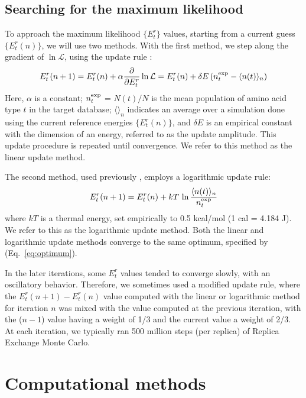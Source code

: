 \documentclass[12pt]{article}
\begin{document}
\subsection{Searching for the maximum likelihood}
To approach the maximum likelihood $\{E^r_t\}$ values, starting from a current guess $\{E^r_t(n)\}$, we will
use two methods. With the first method, we  step along the gradient of $\ln {\mathcal L}$, using the update
rule \cite{Kleinman06}:
\begin{equation} \label{eq:linear}
E^r_t (n+1) = E^r_t (n) + \alpha \frac{\partial}{\partial E^r_t} \ln {\mathcal L}
= E^r_t (n) + \delta E \, ( n_t^{\rm exp} - \langle n(t) \rangle_n)
\end{equation}
Here, $\alpha$ is a constant; $n_t^{\rm exp}$ = $N(t)/N$ is the mean population of amino acid type $t$ in the target
database; $\langle \rangle_n$ indicates an average over a simulation done using the current reference energies
$\{E^r_t(n)\}$, and $\delta E$ is an empirical constant with the dimension of an energy, referred to as the update
amplitude. This update procedure is repeated until convergence. We refer to this method as the linear update method.

The second method, used previously \cite{Schmidt08,Simonson13b}, employs a logarithmic update rule:
\begin{equation} \label{eq:log}
E^r_t (n+1) = E^r_t (n) + kT \, \ln \frac{\langle n(t) \rangle_n}{n_t^{\rm exp}}
\end{equation}
where $kT$ is a thermal energy, set empirically to 0.5 kcal/mol (1 cal = 4.184 J). We refer to this as the logarithmic
update method. Both the linear and logarithmic update methods converge to the same optimum, specified by (Eq.\
\ref{eq:optimum}). 

In the later iterations, some $E^r_t$ values tended to converge slowly, with an oscillatory behavior. Therefore,
we sometimes used a modified update rule, where the $E^r_t (n+1) - E^r_t (n)$ value computed with the linear or
logarithmic method for iteration $n$ was mixed with the value computed at the previous iteration, with the
($n-1$) value having a weight of 1/3 and the current value a weight of 2/3. At each iteration, we typically ran
500 million steps (per replica) of Replica Exchange Monte Carlo.

\section{Computational methods}
\end{document}

